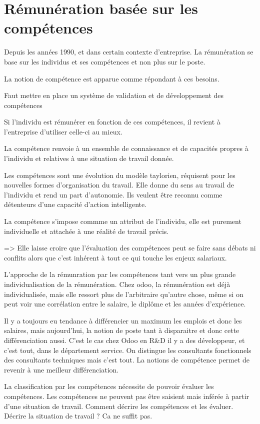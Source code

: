 \section{Rémunération basée sur les compétences} \cite{gestionressourceshumaine2007}
Depuis les années 1990, et dans certain contexte d'entreprise. La rémunération se base sur les individus et ses compétences et non plus sur le poste. 

La notion de compétence est apparue comme répondant à ces besoins. 

Faut mettre en place un système de validation et de développement des compétences

Si l'individu est rémunérer en fonction de ces compétences, il revient à l'entreprise d'utiliser celle-ci au mieux. 

La compétence renvoie à un ensemble de connaissance et de capacités propres à l'individu et relatives à une situation de travail donnée. 

Les compétences sont une évolution du modèle taylorien, réquisent pour les nouvelles formes d'organisation du travail. Elle donne du sens au travail de l'individu et rend un part d'autonomie. Ils veulent être reconnu comme détenteurs d'une capacité d'action intelligente. 

La compétence s'impose commme un attribut de l'individu, elle est purement individuelle et attachée à une réalité de travail précis. 

=> Elle laisse croire que l'évaluation des compétences peut se faire sans débats ni conflits alors que c'est inhérent à tout ce qui touche les enjeux salariaux. 

L'approche de la rémunration par les compétences tant vers un plus grande individualisation de la rémunération.
Chez odoo, la rémunération est déjà individualisée, mais elle ressort plus de l'arbitraire qu'autre chose, même si on peut voir une corrélation entre le salaire, le diplôme et les années d'expérience. 

Il y a toujours eu tendance à différencier un maximum les emplois et donc les salaires, mais aujourd'hui, la notion de poste tant à disparaitre et donc cette différenciation aussi. C'est le cas chez Odoo en R\&D il y a des développeur, et c'est tout, dans le département service. On distingue les consultants fonctionnels des consultants techniques mais c'est tout. La notions de compétence permet de revenir à une meilleur différenciation. 

La classification par les compétences nécessite de pouvoir évaluer les compétences. Les compétences ne peuvent pas être saisient mais inférée à partir d'une situation de travail. Comment décrire les compétences et les évaluer. Décrire la situation de travail ? Ca ne suffit pas.


